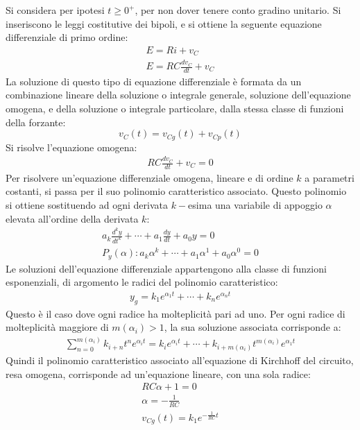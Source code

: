 \documentclass{article}
\numberwithin{equation}{subsection}
\begin{document}
Si considera per ipotesi $t\geq0^+$, per non dover tenere conto gradino unitario. Si inseriscono le leggi costitutive dei bipoli, e si ottiene la seguente equazione 
differenziale di primo ordine:
\begin{gather*}
    E=Ri+v_C\\
    E=RC\displaystyle\frac{dv_C}{dt}+v_C
\end{gather*}
La soluzione di questo tipo di equazione differenziale è formata da un combinazione lineare della soluzione o integrale generale, soluzione dell'equazione omogena, e 
della soluzione o integrale particolare, dalla stessa classe di funzioni della forzante:
\begin{equation*}
    v_C(t)=v_{Cg}(t)+v_{Cp}(t)
\end{equation*}
Si risolve l'equazione omogena:
\begin{gather*}
    RC\displaystyle\frac{dv_C}{dt}+v_C=0
\end{gather*}
Per risolvere un'equazione differenziale omogena, lineare e di ordine $k$ a parametri costanti, si passa per il suo polinomio caratteristico associato. Questo polinomio 
si ottiene sostituendo ad ogni derivata $k-$esima una variabile di appoggio $\alpha$ elevata all'ordine della derivata $k$:
\begin{gather*}
    \displaystyle a_k\frac{d^ky}{dt^k}+\cdots+a_1\frac{dy}{dt}+a_0y=0\\
    P_y(\alpha):a_k\alpha^k+\cdots+a_1\alpha^1+a_0\alpha^0=0
\end{gather*}
Le soluzioni dell'equazione differenziale appartengono alla classe di funzioni esponenziali, di argomento le radici del polinomio caratteristico:
\begin{gather*}
    y_g=k_1e^{\alpha_1t}+\cdots+k_ne^{\alpha_nt}
\end{gather*}
Questo è il caso dove ogni radice ha molteplicità pari ad uno. Per ogni radice di molteplicità maggiore di $m(\alpha_i)>1$, la sua soluzione associata corrisponde a:
\begin{gather*}
    \displaystyle\sum_{n=0}^{m(\alpha_i)}k_{i+n}t^ne^{\alpha_it}=k_ie^{\alpha_it}+\cdots+k_{i+m(\alpha_i)}t^{m(\alpha_i)}e^{\alpha_1t}
\end{gather*}
Quindi il polinomio caratteristico associato all'equazione di Kirchhoff del circuito, resa omogena, corrisponde ad un'equazione lineare, con una sola radice:
\begin{gather*}
    RC\alpha+1=0\\
    \alpha=\displaystyle-\frac{1}{RC}\\
    v_{Cg}(t)=k_1e^{-\frac{1}{RC}t}
\end{gather*}
\end{document}
